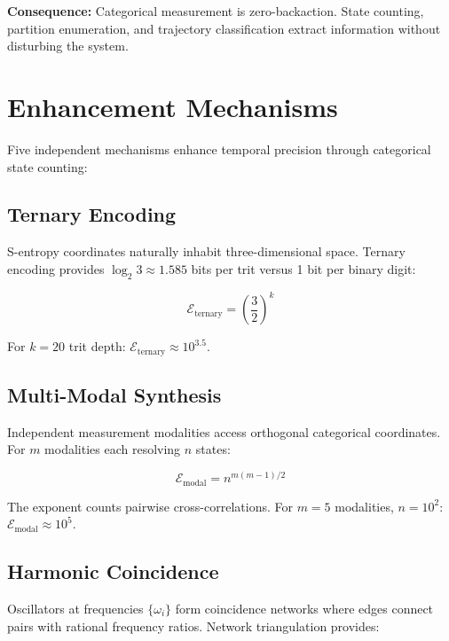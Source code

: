 \documentclass[10pt,twocolumn]{article}
\theoremstyle{definition}
\theoremstyle{remark}
\begin{document}
\textbf{Consequence:} Categorical measurement is zero-backaction. State counting, partition enumeration, and trajectory classification extract information without disturbing the system.

\section{Enhancement Mechanisms}
\label{sec:enhancement}

Five independent mechanisms enhance temporal precision through categorical state counting:

\subsection{Ternary Encoding}

S-entropy coordinates naturally inhabit three-dimensional space. Ternary encoding provides $\log_2 3 \approx 1.585$ bits per trit versus 1 bit per binary digit:

\begin{equation}
\mathcal{E}_{\text{ternary}} = \left(\frac{3}{2}\right)^k
\end{equation}

For $k = 20$ trit depth: $\mathcal{E}_{\text{ternary}} \approx 10^{3.5}$.

\subsection{Multi-Modal Synthesis}

Independent measurement modalities access orthogonal categorical coordinates. For $m$ modalities each resolving $n$ states:

\begin{equation}
\mathcal{E}_{\text{modal}} = n^{m(m-1)/2}
\end{equation}

The exponent counts pairwise cross-correlations. For $m = 5$ modalities, $n = 10^2$: $\mathcal{E}_{\text{modal}} \approx 10^{5}$.

\subsection{Harmonic Coincidence}

Oscillators at frequencies $\{\omega_i\}$ form coincidence networks where edges connect pairs with rational frequency ratios. Network triangulation provides:
\end{document}
